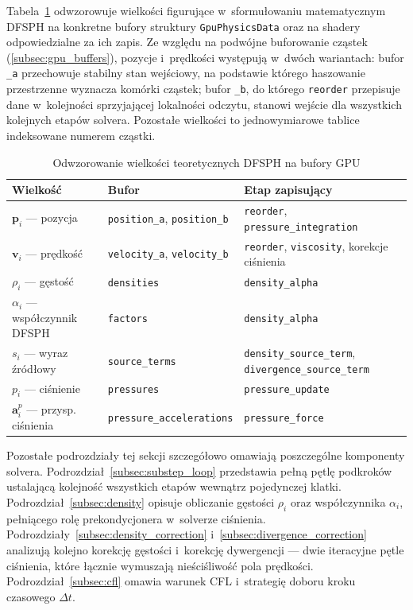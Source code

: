 Tabela~\ref{tab:dfsph_variable_mapping} odwzorowuje wielkości figurujące
w~sformułowaniu matematycznym DFSPH na konkretne bufory struktury
\texttt{GpuPhysicsData} oraz na shadery odpowiedzialne za ich zapis.
Ze względu na podwójne buforowanie cząstek (\ref{subsec:gpu_buffers}),
pozycje i~prędkości występują w~dwóch wariantach: bufor \texttt{\_a}
przechowuje stabilny stan wejściowy, na podstawie którego haszowanie
przestrzenne wyznacza komórki cząstek; bufor \texttt{\_b}, do którego
\texttt{reorder} przepisuje dane w~kolejności sprzyjającej lokalności
odczytu, stanowi wejście dla wszystkich kolejnych etapów solvera.
Pozostałe wielkości to jednowymiarowe tablice indeksowane numerem cząstki.

\begin{table}[H]
\centering
\caption{Odwzorowanie wielkości teoretycznych DFSPH na bufory GPU}
\label{tab:dfsph_variable_mapping}
\begin{tabular}{p{4.8cm}p{4.5cm}p{4.5cm}}
\toprule
\textbf{Wielkość} & \textbf{Bufor} & \textbf{Etap zapisujący} \\
\midrule
$\mathbf{p}_i$ --- pozycja                  & \texttt{position\_a}, \texttt{position\_b}    & \texttt{reorder}, \texttt{pressure\_integration} \\[3pt]
$\mathbf{v}_i$ --- prędkość                 & \texttt{velocity\_a}, \texttt{velocity\_b}    & \texttt{reorder}, \texttt{viscosity}, korekcje ciśnienia \\[3pt]
$\rho_i$ --- gęstość                        & \texttt{densities}                            & \texttt{density\_alpha} \\[3pt]
$\alpha_i$ --- współczynnik DFSPH           & \texttt{factors}                              & \texttt{density\_alpha} \\[3pt]
$s_i$ --- wyraz źródłowy                    & \texttt{source\_terms}                        & \texttt{density\_source\_term}, \texttt{divergence\_source\_term} \\[3pt]
$p_i$ --- ciśnienie                         & \texttt{pressures}                            & \texttt{pressure\_update} \\[3pt]
$\mathbf{a}_i^{p}$ --- przysp. ciśnienia    & \texttt{pressure\_accelerations}              & \texttt{pressure\_force} \\
\bottomrule
\end{tabular}
\end{table}

Pozostałe podrozdziały tej sekcji szczegółowo omawiają poszczególne
komponenty solvera. Podrozdział~\ref{subsec:substep_loop} przedstawia
pełną pętlę podkroków ustalającą kolejność wszystkich etapów wewnątrz
pojedynczej klatki. Podrozdział~\ref{subsec:density} opisuje obliczanie
gęstości $\rho_i$ oraz współczynnika $\alpha_i$, pełniącego rolę
prekondycjonera w~solverze ciśnienia.
Podrozdziały~\ref{subsec:density_correction}
i~\ref{subsec:divergence_correction} analizują kolejno korekcję gęstości
i~korekcję dywergencji --- dwie iteracyjne pętle ciśnienia, które łącznie
wymuszają nieściśliwość pola prędkości. Podrozdział~\ref{subsec:cfl}
omawia warunek CFL i~strategię doboru kroku czasowego $\Delta t$.

